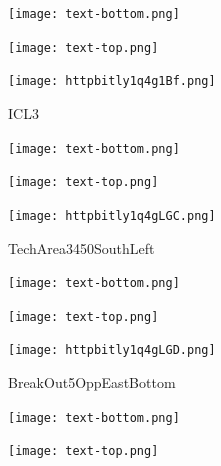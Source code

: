 \documentclass[letterpaper]{article}
\begin{document}
 \centerline{\texttt{[image: text-bottom.png]}} 
 
 \pagebreak 
{} 
 \vspace*{\fill} 
 
  \centerline{\texttt{[image: text-top.png]}} 
 
 \vspace{0.5in} 
 
 \begingroup 
 \centerline{\texttt{[image: httpbitly1q4g1Bf.png]}} 
 \endgroup 
 \vspace*{\fill} 

 \hfill{\small ICL3} 

  \vspace{0.7in} 
 
 \centerline{\texttt{[image: text-bottom.png]}} 
 
 \pagebreak 
{} 
 \vspace*{\fill} 
 
  \centerline{\texttt{[image: text-top.png]}} 
 
 \vspace{0.5in} 
 
 \begingroup 
 \centerline{\texttt{[image: httpbitly1q4gLGC.png]}} 
 \endgroup 
 \vspace*{\fill} 

 \hfill{\small TechArea3450SouthLeft} 

  \vspace{0.7in} 
 
 \centerline{\texttt{[image: text-bottom.png]}} 
 
 \pagebreak 
{} 
 \vspace*{\fill} 
 
  \centerline{\texttt{[image: text-top.png]}} 
 
 \vspace{0.5in} 
 
 \begingroup 
 \centerline{\texttt{[image: httpbitly1q4gLGD.png]}} 
 \endgroup 
 \vspace*{\fill} 

 \hfill{\small BreakOut5OppEastBottom} 

  \vspace{0.7in} 
 
 \centerline{\texttt{[image: text-bottom.png]}} 
 
 \pagebreak 
{} 
 \vspace*{\fill} 
 
  \centerline{\texttt{[image: text-top.png]}} 
 
 \vspace{0.5in} 
 
\end{document}
